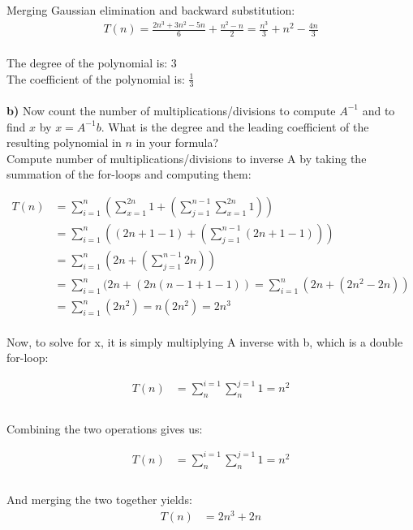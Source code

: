 \documentclass{article}
\begin{document}
Merging Gaussian elimination and backward substitution: \\
\begin{align*}
T(n) = \frac{2n^3 + 3n^2 - 5n}{6} + \frac{n^2 - n}{2} = \frac{n^3}{3} + n^2 - \frac{4n}{3}
\end{align*} \\

The degree of the polynomial is: 3\\
The coefficient of the polynomial is: $\frac{1}{3}$ \\\\

{\bf b)} Now count the number of multiplications/divisions to compute $A^{-1}$ and
to find $x$ by $x=A^{-1}b$. What is the degree and the leading
coefficient of the resulting polynomial in $n$ in your formula? \\

Compute number of multiplications/divisions to inverse A by taking the summation of the for-loops and computing them:

\begin{align*}
T(n) &= \sum_{i=1}^{n} ( \sum_{x=1}^{2n} 1 +  (\sum_{j=1}^{n-1} \sum_{x=1}^{2n} 1) ) \\
     &= \sum_{i=1}^{n} ( (2n+1-1) + (\sum_{j=1}^{n-1} (2n+1-1)) ) \\
     &= \sum_{i=1}^{n} ( 2n + (\sum_{j=1}^{n-1} 2n) ) \\
     &= \sum_{i=1}^{n} ( 2n + (2n(n-1+1-1)) = \sum_{i=1}^{n} ( 2n + (2n^2 - 2n)) \\
     &= \sum_{i=1}^{n} (2n^2) = n(2n^2) = 2n^3
\end{align*} \\

Now, to solve for x, it is simply multiplying A inverse with b, which is a double for-loop:

\begin{align*}
T(n) &= \sum_{n}^{i=1} \sum_{n}^{j=1} 1 = n^2\\
\end{align*} \\

Combining the two operations gives us:

\begin{align*}
T(n) &= \sum_{n}^{i=1} \sum_{n}^{j=1} 1 = n^2\\
\end{align*} \\

And merging the two together yields:
\begin{align*}
T(n) &= 2n^3 + 2n\\
\end{align*}
\end{document}
